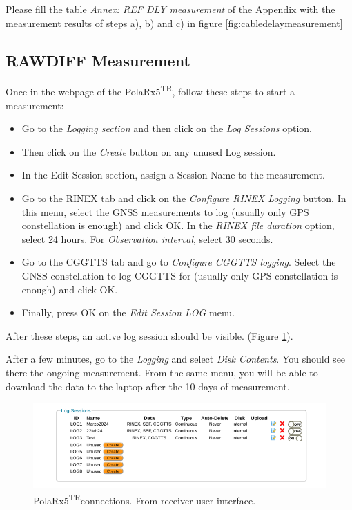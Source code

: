\documentclass[11pt]{article}
\newcommand{\polar}[0]{PolaRx5\textsuperscript{TR}}
\begin{document}
Please fill the table \textit{Annex: REF DLY measurement} of the Appendix with the measurement results of steps a), b) and c) in figure \ref{fig:cabledelaymeasurement}



\subsection{RAWDIFF Measurement}
Once in the webpage of the \polar, follow these steps to start a measurement:

\begin{itemize}
    \item Go to the \textit{Logging section} and then click on the \textit{Log Sessions} option.
    \item Then click on the \textit{Create} button on any unused Log session.
    \item In the Edit Session section, assign a Session Name to the measurement.
    \item Go to the RINEX tab and click on the \textit{Configure RINEX Logging} button. In this menu, select the GNSS measurements to log (usually only GPS constellation is enough) and click OK. In the \textit{RINEX file duration} option, select 24 hours. For \textit{Observation interval}, select 30 seconds.
    \item Go to the CGGTTS tab and go to \textit{Configure CGGTTS logging}. Select the GNSS constellation to log CGGTTS for (usually only GPS constellation is enough) and click OK.
    \item Finally, press OK on the \textit{Edit Session LOG} menu.
\end{itemize}

After these steps, an active log session should be visible. (Figure \ref{fig:screenPolar4}).

After a few minutes, go to the \textit{Logging} and select \textit{Disk Contents}. You should see there the ongoing measurement. From the same menu, you will be able to download the data to the laptop after the 10 days of measurement.  



   \begin{figure}[ht]
    \begin{center}
    \includegraphics[width=1\linewidth]{./Figures/screenPolar4.png}
    \caption{\polar connections. From receiver user-interface. } \label{fig:screenPolar4}
    \end{center}
    \end{figure}
\end{document}
